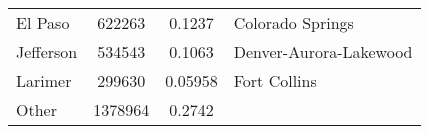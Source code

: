 \documentclass[12pt,twoside]{reedthesis}
\begin{document}
\begin{longtable}[]{@{}lccl@{}}
\begin{minipage}[t]{0.13\columnwidth}
  El Paso\strut
  \end{minipage} & \begin{minipage}[t]{0.21\columnwidth}\centering\strut
  622263\strut
  \end{minipage} & \begin{minipage}[t]{0.20\columnwidth}\centering\strut
  0.1237\strut
  \end{minipage} & \begin{minipage}[t]{0.34\columnwidth}\raggedright\strut
  Colorado Springs\strut
  \end{minipage}\tabularnewline
  \begin{minipage}[t]{0.13\columnwidth}\raggedright\strut
  Jefferson\strut
  \end{minipage} & \begin{minipage}[t]{0.21\columnwidth}\centering\strut
  534543\strut
  \end{minipage} & \begin{minipage}[t]{0.20\columnwidth}\centering\strut
  0.1063\strut
  \end{minipage} & \begin{minipage}[t]{0.34\columnwidth}\raggedright\strut
  Denver-Aurora-Lakewood\strut
  \end{minipage}\tabularnewline
  \begin{minipage}[t]{0.13\columnwidth}\raggedright\strut
  Larimer\strut
  \end{minipage} & \begin{minipage}[t]{0.21\columnwidth}\centering\strut
  299630\strut
  \end{minipage} & \begin{minipage}[t]{0.20\columnwidth}\centering\strut
  0.05958\strut
  \end{minipage} & \begin{minipage}[t]{0.34\columnwidth}\raggedright\strut
  Fort Collins\strut
  \end{minipage}\tabularnewline
  \begin{minipage}[t]{0.13\columnwidth}\raggedright\strut
  Other\strut
  \end{minipage} & \begin{minipage}[t]{0.21\columnwidth}\centering\strut
  1378964\strut
  \end{minipage} & \begin{minipage}[t]{0.20\columnwidth}\centering\strut
  0.2742\strut
  \end{minipage} & \begin{minipage}[t]{0.34\columnwidth}\raggedright\strut

\end{minipage}
\end{longtable}
\end{document}
